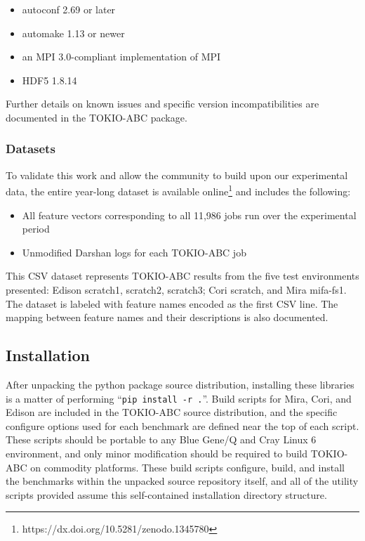 \begin{itemize}
\item autoconf 2.69 or later
\item automake 1.13 or newer
\item an MPI 3.0-compliant implementation of MPI
\item HDF5 1.8.14
\end{itemize}

Further details on known issues and specific version incompatibilities are documented in the TOKIO-ABC package.

\subsubsection{Datasets}

To validate this work and allow the community to build upon our experimental data, the entire year-long dataset is available online\footnote{https://dx.doi.org/10.5281/zenodo.1345780} and includes the following:

\begin{itemize}
\item All feature vectors corresponding to all 11,986 jobs run over the experimental period
\item Unmodified Darshan logs for each TOKIO-ABC job
\end{itemize}

This CSV dataset represents TOKIO-ABC results from the five test environments presented:
Edison scratch1, scratch2, scratch3; Cori scratch, and Mira mifa-fs1.
The dataset is labeled with feature names encoded as the first CSV line.
The mapping between feature names and their descriptions is also documented.

\subsection{Installation}

After unpacking the python package source distribution, installing these libraries is a matter of performing ``\texttt{{pip install -r .}}''.
Build scripts for Mira, Cori, and Edison are included in the TOKIO-ABC source distribution, and the specific configure options used for each benchmark are defined near the top of each script.
These scripts should be portable to any Blue Gene/Q and Cray Linux 6 environment, and only minor modification should be required to build TOKIO-ABC on commodity platforms.
These build scripts configure, build, and install the benchmarks within the unpacked source repository itself, and all of the utility scripts provided assume this self-contained installation directory structure.


